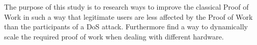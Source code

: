 The purpose of this study is to research ways to improve the classical Proof of Work in such a way that legitimate users are less affected by the Proof of Work than the participants of a DoS attack. Furthermore find a way to dynamically scale the required proof of work when dealing with different hardware.